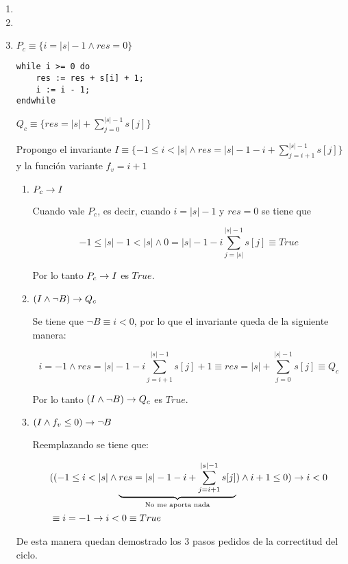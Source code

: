 \begin{enumerate}[label=\alph*)]
    \item \hacer
    \item \hacer
    \item $P_c \equiv \{i = |s| - 1 \land res = 0\}$

          \begin{lstlisting}
while i >= 0 do
    res := res + s[i] + 1;
    i := i - 1;
endwhile
    \end{lstlisting}

          $Q_c \equiv \{res = |s| + \sum_{j=0}^{|s| - 1} s[j]\}$

          Propongo el invariante $I \equiv \{-1 \leq i < |s| \land res = |s| - 1 - i + \sum_{j=i+1}^{|s| - 1} s[j]\}$ y la función variante $f_v = i + 1$

          \begin{enumerate}[label=\roman*)]
              \item $P_c \rightarrow I$

                    Cuando vale $P_c$, es decir, cuando $i = |s| - 1$ y $res = 0$ se tiene que

                    \[-1 \leq |s| - 1 < |s| \land 0 = |s| - 1 - i \sum_{j=|s|}^{|s| - 1} s[j] \equiv True\]

                    Por lo tanto $P_c \rightarrow I$ es $True$.

              \item $(I \land \neg B) \rightarrow Q_c$

                    Se tiene que $\neg B \equiv i < 0$, por lo que el invariante queda de la siguiente manera:

                    \[i = -1 \land res = |s| - 1 - i \sum_{j=i+1}^{|s| - 1} s[j] + 1 \equiv res = |s| + \sum_{j = 0}^{|s| - 1} s[j] \equiv Q_c\]

                    Por lo tanto $(I \land \neg B) \rightarrow Q_c$ es $True$.

              \item $(I \land f_v \leq 0) \rightarrow \neg B$

                    Reemplazando se tiene que:

                    \begin{align*}
                         & ((-1 \leq i < |s| \land \underbrace{res = |s| - 1 - i + \sum_{j=i+1}^{|s| - 1} s[j]}_{\text{No me aporta nada}}) \land i + 1 \leq 0) \rightarrow i < 0 \\
                         & \equiv i = -1 \rightarrow i < 0 \equiv True
                    \end{align*}
          \end{enumerate}

          De esta manera quedan demostrado los 3 pasos pedidos de la correctitud del ciclo.
\end{enumerate}


